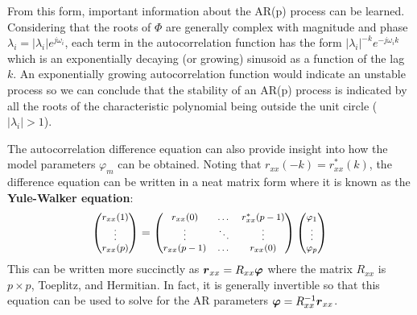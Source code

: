 \documentclass[twocolumn]{gwclass}
\begin{document}
From this form, important information about the AR(p) process can be learned. Considering that the roots of $\Phi$ are generally complex with magnitude and phase $\lambda_i=|\lambda_i|e^{j\omega_i}$, each term in the autocorrelation function has the form $|\lambda_i|^{-k} e^{-j\omega_i k}$ which is an exponentially decaying (or growing) sinusoid as a function of the lag $k$. An exponentially growing autocorrelation function would indicate an unstable process so we can conclude that the stability of an AR(p) process is indicated by all the roots of the characteristic polynomial being outside the unit circle ($|\lambda_i|>1$).


The autocorrelation difference equation can also provide insight into how the model parameters $\varphi_m$ can be obtained. Noting that $r_{xx}(-k)=r_{xx}^*(k)$, the difference equation can be written in a neat matrix form where it is known as the \textbf{Yule-Walker equation}:
$$\footnotesize \begin{pmatrix}
	r_{xx}(1) \\
	\vdots \\
	r_{xx}(p)
\end{pmatrix} = 
\begin{pmatrix}
r_{xx}(0) & \dots & r_{xx}^*(p-1) \\
\vdots & \ddots & \vdots \\
r_{xx}(p-1) & \dots & r_{xx}(0)
\end{pmatrix}
\begin{pmatrix}
\varphi_1 \\
\vdots \\
\varphi_p
\end{pmatrix} $$
This can be written more succinctly as $\boldsymbol{r}_{xx}=R_{xx}\boldsymbol{\varphi}$ where the matrix $R_{xx}$ is $p\times p$, Toeplitz, and Hermitian. In fact, it is generally invertible so that this equation can be used to solve for the AR parameters $\boldsymbol{\varphi} = R_{xx}^{-1}\boldsymbol{r}_{xx}$.
\end{document}
